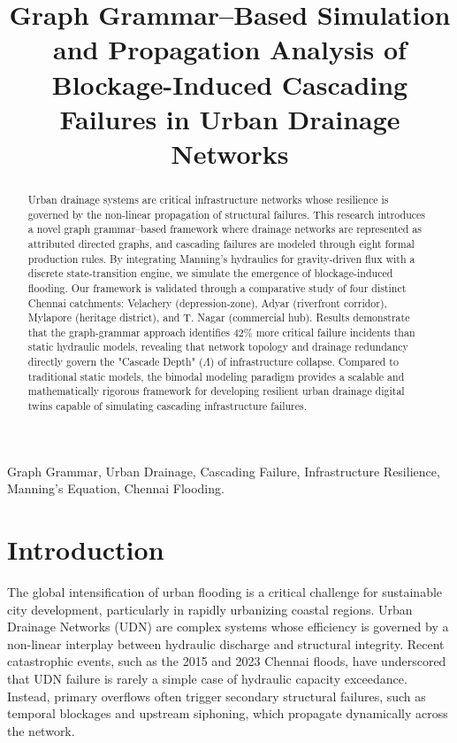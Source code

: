 \documentclass[conference]{IEEEtran}
\begin{document}
\title{Graph Grammar--Based Simulation and Propagation Analysis of Blockage-Induced Cascading Failures in Urban Drainage Networks}

\author{
}

\maketitle

\begin{abstract}
Urban drainage systems are critical infrastructure networks whose resilience is governed by the non-linear propagation of structural failures. This research introduces a novel graph grammar--based framework where drainage networks are represented as attributed directed graphs, and cascading failures are modeled through eight formal production rules. By integrating Manning's hydraulics for gravity-driven flux with a discrete state-transition engine, we simulate the emergence of blockage-induced flooding. Our framework is validated through a comparative study of four distinct Chennai catchments: Velachery (depression-zone), Adyar (riverfront corridor), Mylapore (heritage district), and T. Nagar (commercial hub). Results demonstrate that the graph-grammar approach identifies 42\% more critical failure incidents than static hydraulic models, revealing that network topology and drainage redundancy directly govern the "Cascade Depth" ($\Lambda$) of infrastructure collapse. Compared to traditional static models, the bimodal modeling paradigm provides a scalable and mathematically rigorous framework for developing resilient urban drainage digital twins capable of simulating cascading infrastructure failures.
\end{abstract}

\begin{IEEEkeywords}
Graph Grammar, Urban Drainage, Cascading Failure, Infrastructure Resilience, Manning's Equation, Chennai Flooding.
\end{IEEEkeywords}

\section{Introduction}
The global intensification of urban flooding is a critical challenge for sustainable city development, particularly in rapidly urbanizing coastal regions. Urban Drainage Networks (UDN) are complex systems whose efficiency is governed by a non-linear interplay between hydraulic discharge and structural integrity. Recent catastrophic events, such as the 2015 and 2023 Chennai floods, have underscored that UDN failure is rarely a simple case of hydraulic capacity exceedance. Instead, primary overflows often trigger secondary structural failures, such as temporal blockages and upstream siphoning, which propagate dynamically across the network.
\end{document}
